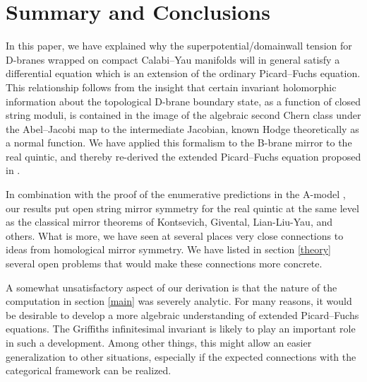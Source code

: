 \section{Summary and Conclusions}
\label{summary}

In this paper, we have explained why the superpotential/domainwall
tension for D-branes wrapped on compact Calabi--Yau manifolds will in
general satisfy a differential equation which is an extension
of the ordinary Picard--Fuchs equation. This relationship follows
from the insight that certain invariant holomorphic information 
about the topological D-brane boundary state, as a function of 
closed string moduli, is contained in the image of the algebraic
second Chern class under the Abel--Jacobi map to the intermediate
Jacobian, known Hodge theoretically as a normal function.
We have applied this formalism to the B-brane mirror to the real
quintic, and thereby re-derived the extended Picard--Fuchs equation
proposed in \cite{open}.

In combination with the proof of the enumerative predictions in the
A-model \cite{psw}, our results put open string mirror symmetry
for the real quintic \cite{open} at the same level as the
classical mirror theorems of Kontsevich, Givental, Lian-Liu-Yau,
and others. What is more, we have seen at several places very close 
connections to ideas from homological mirror symmetry. We have listed 
in section \ref{theory} several open problems that would make these
connections more concrete.

A somewhat unsatisfactory aspect of our derivation is that the
nature of the computation in section \ref{main} was severely
analytic. For many reasons, it would be desirable to develop 
a more algebraic understanding of extended Picard--Fuchs equations. 
The Griffiths infinitesimal invariant is likely to play an 
important role in such a development. Among other things, this 
might allow an easier generalization to other situations, especially 
if the expected connections with the categorical framework can be 
realized.


